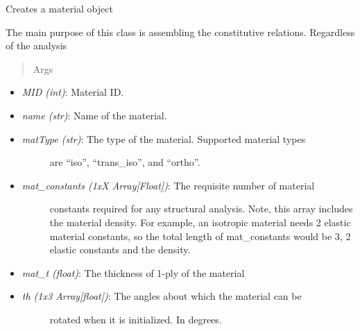 \documentclass[letterpaper,10pt,english]{sphinxmanual}
\begin{document}
\begin{fulllineitems}
\begin{fulllineitems}
\label{structures:AeroComBAT.Structures.Material.__init__}
Creates a material object

The main purpose of this class is assembling the constitutive
relations. Regardless of the analysis
\begin{quote}\begin{description}
\item[{Args}] \leavevmode
\end{description}\end{quote}
\begin{itemize}
\item {} 
\emph{MID (int)}: Material ID.

\item {} 
\emph{name (str)}: Name of the material.

\item {} \begin{description}
\item[{\emph{matType (str)}: The type of the material. Supported material types}] \leavevmode
are ``iso'', ``trans\_iso'', and ``ortho''.

\end{description}

\item {} \begin{description}
\item[{\emph{mat\_constants (1xX Array{[}Float{]})}: The requisite number of material}] \leavevmode
constants required for any structural analysis. Note, this
array includes the material density. For example, an isotropic
material needs 2 elastic material constants, so the total
length of mat\_constants would be 3, 2 elastic constants and the
density.

\end{description}

\item {} 
\emph{mat\_t (float)}: The thickness of 1-ply of the material

\item {} \begin{description}
\item[{\emph{th (1x3 Array{[}float{]})}: The angles about which the material can be}] \leavevmode
rotated when it is initialized. In degrees.

\end{description}


\end{itemize}
\end{fulllineitems}
\end{fulllineitems}
\end{document}
